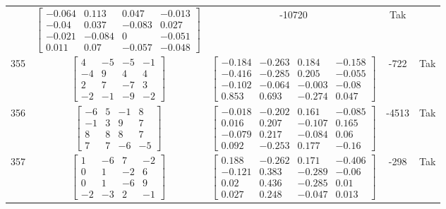 \documentclass[a4paper,12pt]{article}
\begin{document}
\begin{tabular}{c c c c c}
&
$\begin{bmatrix} -0.064 & 0.113 & 0.047 & -0.013 \\ -0.04 & 0.037 & -0.083 & 0.027 \\ -0.021 & -0.084 & 0 & -0.051 \\ 0.011 & 0.07 & -0.057 & -0.048 \end{bmatrix}$
&
-10720
&
Tak
\\
355
&
$\begin{bmatrix} 4 & -5 & -5 & -1 \\ -4 & 9 & 4 & 4 \\ 2 & 7 & -7 & 3 \\ -2 & -1 & -9 & -2 \end{bmatrix}$
&
$\begin{bmatrix} -0.184 & -0.263 & 0.184 & -0.158 \\ -0.416 & -0.285 & 0.205 & -0.055 \\ -0.102 & -0.064 & -0.003 & -0.08 \\ 0.853 & 0.693 & -0.274 & 0.047 \end{bmatrix}$
&
-722
&
Tak
\\
356
&
$\begin{bmatrix} -6 & 5 & -1 & 8 \\ -1 & 3 & 9 & 7 \\ 8 & 8 & 8 & 7 \\ 7 & 7 & -6 & -5 \end{bmatrix}$
&
$\begin{bmatrix} -0.018 & -0.202 & 0.161 & -0.085 \\ 0.016 & 0.207 & -0.107 & 0.165 \\ -0.079 & 0.217 & -0.084 & 0.06 \\ 0.092 & -0.253 & 0.177 & -0.16 \end{bmatrix}$
&
-4513
&
Tak
\\
357
&
$\begin{bmatrix} 1 & -6 & 7 & -2 \\ 0 & 1 & -2 & 6 \\ 0 & 1 & -6 & 9 \\ -2 & -3 & 2 & -1 \end{bmatrix}$
&
$\begin{bmatrix} 0.188 & -0.262 & 0.171 & -0.406 \\ -0.121 & 0.383 & -0.289 & -0.06 \\ 0.02 & 0.436 & -0.285 & 0.01 \\ 0.027 & 0.248 & -0.047 & 0.013 \end{bmatrix}$
&
-298
&
Tak
\\

\end{tabular}
\end{document}
